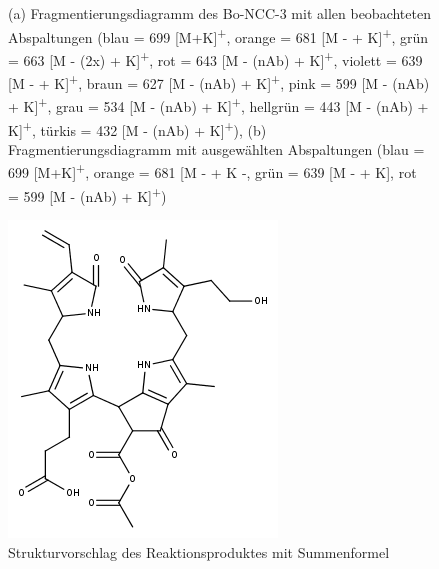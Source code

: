 \begin{figure}[!htbp]
  \caption[Fragmentierungsdiagramme des Reaktionsproduktes von Bo-DNCC, Quelle: Author]{(a) Fragmentierungsdiagramm des Bo-NCC-3 mit allen beobachteten Abspaltungen (blau = 699 [M+K]\textsuperscript{+}, orange = 681 [M -  + K]\textsuperscript{+}, grün = 663 [M - (2x) + K]\textsuperscript{+}, rot = 643 [M - (\gls{nAb}) + K]\textsuperscript{+}, violett = 639 [M -  + K]\textsuperscript{+}, braun = 627 [M - (\gls{nAb}) + K]\textsuperscript{+}, pink = 599 [M - (\gls{nAb}) + K]\textsuperscript{+}, grau = 534 [M - (\gls{nAb}) + K]\textsuperscript{+}, hellgrün = 443 [M - (\gls{nAb}) + K]\textsuperscript{+}, türkis = 432 [M - (\gls{nAb}) + K]\textsuperscript{+}), (b) Fragmentierungsdiagramm mit ausgewählten Abspaltungen (blau = 699 [M+K]\textsuperscript{+}, orange = 681 [M -  + K -, grün = 639 [M -  + K], rot = 599 [M - (\gls{nAb}) + K]\textsuperscript{+})}
\end{figure}

\begin{figure}[!htbp]
  \centering
  \includegraphics[scale=0.5]{figures/Kapitel4/Kataboliten/fragmentation_structures/VWA_Katabolit_699.png}
  \caption[Strukturvorschlag des Reaktionsproduktes von Bo-DNCC, Quelle: Author]{Strukturvorschlag des Reaktionsproduktes mit Summenformel }
  \label{fig:699MKstructure}
\end{figure}

